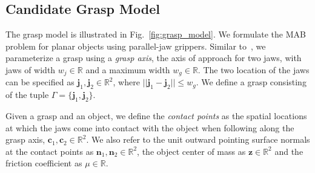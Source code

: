 \documentclass[10pt, conference]{ieeeconf}      %
\newcommand{\bc}{\mathbf{c}}
\newcommand{\bn}{\mathbf{n}}
\newcommand{\bz}{\mathbf{z}}
\begin{document}
\subsection{Candidate Grasp Model}
The grasp model is illustrated in Fig.~\ref{fig:grasp_model}. We formulate the MAB problem for planar objects using parallel-jaw grippers. Similar to~\cite{mahler2015gp}, we parameterize a grasp using a {\it grasp axis}, the axis of approach for two jaws,  with jaws of width $w_j \in \mathbb{R}$ and a maximum width $w_g \in \mathbb{R}$. The two location of the jaws can be specified as $\mathbf{j}_1,\mathbf{j}_2 \in \mathbb{R}^2$, where $||\mathbf{j}_1 - \mathbf{j}_2|| \leq w_g$. We define a grasp consisting of the tuple $\Gamma = \lbrace \mathbf{j}_1, \mathbf{j}_2 \rbrace$. 


Given a grasp and an object, we define the {\it contact points} as the spatial locations at which the jaws come into contact with the object when following along the grasp axis, $\bc_1, \bc_2 \in \mathbb{R}^2$.
We also refer to the unit outward pointing surface normals at the contact points as $\bn_1, \bn_2 \in \mathbb{R}^2$, the object center of mass as $\bz \in \mathbb{R}^2$ and the friction coefficient as $\mu \in \mathbb{R}$.

\end{document}
